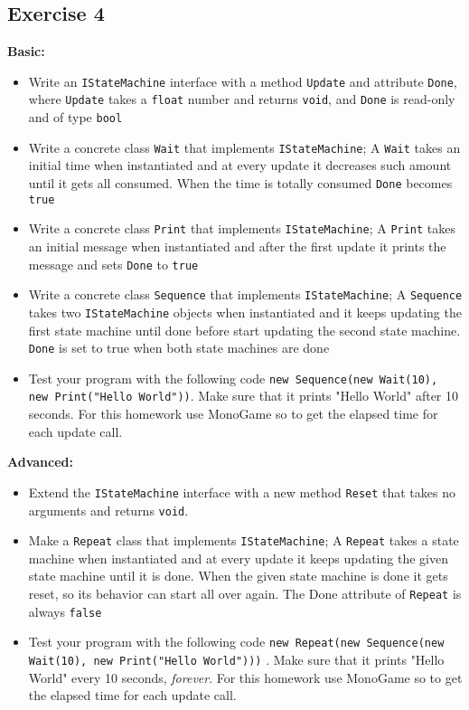      \subsection{Exercise 4}
     \label{chapter: Reuse through polymorphism}     
     	 \textbf{Basic:}
         \begin{myprop}
	     \begin{itemize}
	     	\item Write an \texttt{IStateMachine} interface with a method \texttt{Update} and attribute \texttt{Done}, where \texttt{Update} takes a \texttt{float} number and returns \texttt{void}, and \texttt{Done} is read-only and of type \texttt{bool}
	     	\item Write a concrete class \texttt{Wait} that implements \texttt{IStateMachine}; A \texttt{Wait} takes an initial time when instantiated and at every update it decreases such amount until it gets all consumed. When the time is totally consumed \texttt{Done} becomes \texttt{true}
		    \item Write a concrete class \texttt{Print} that implements \texttt{IStateMachine}; A \texttt{Print} takes an initial message when instantiated and after the first update it prints the message and sets \texttt{Done} to \texttt{true}
		    \item Write a concrete class \texttt{Sequence} that implements \texttt{IStateMachine}; A \texttt{Sequence} takes two \texttt{IStateMachine} objects when instantiated and it keeps updating the first state machine until done before start updating the second state machine. \texttt{Done} is set to true when both state machines are done  
		    \item Test your program with the following code \texttt{new Sequence(new Wait(10), new Print("Hello World"))}. Make sure that it prints "Hello World" after 10 seconds. For this homework use MonoGame so to get the elapsed time for each update call.
	     \end{itemize}
	     \end{myprop}
	     \textbf{Advanced:}
	     \begin{myprop}
	     \begin{itemize}
	     	\item Extend the \texttt{IStateMachine} interface with a new method \texttt{Reset} that takes no arguments and returns \texttt{void}.
	     	\item Make a \texttt{Repeat} class that implements \texttt{IStateMachine}; A \texttt{Repeat} takes a state machine when instantiated and at every update it keeps updating the given state machine until it is done. When the given state machine is done it gets reset, so its behavior can start all over again. The {Done} attribute of \texttt{Repeat} is always \texttt{false}
	     	\item Test your program with the following code \texttt{new Repeat(new Sequence(new Wait(10), new Print("Hello World")))} . Make sure that it prints "Hello World" every 10 seconds, \textit{forever}. For this homework use MonoGame so to get the elapsed time for each update call.
	     \end{itemize}
	     \end{myprop}
